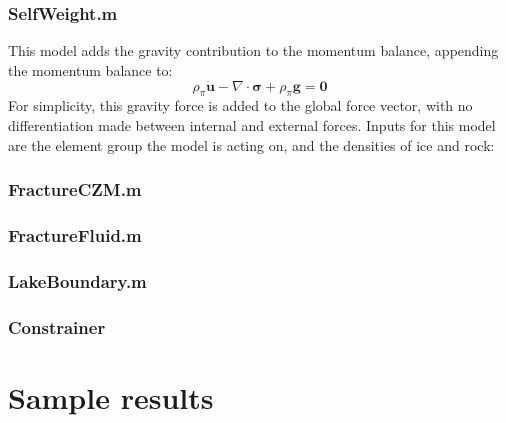 \documentclass[3p]{elsarticle} %
\begin{document}
\subsubsection{SelfWeight.m}
This model adds the gravity contribution to the momentum balance, appending the momentum balance to:
\begin{equation}
	\rho_\pi \ddot{\mathbf{u}} - \nabla \cdot \mathbf{\sigma} + \rho_\pi \mathbf{g}= \mathbf{0}
\end{equation}
For simplicity, this gravity force is added to the global force vector, with no differentiation made between internal and external forces. Inputs for this model are the element group the model is acting on, and the densities of ice and rock:


\subsubsection{FractureCZM.m}



\subsubsection{FractureFluid.m}




\subsubsection{LakeBoundary.m}




\subsubsection{Constrainer}



\section{Sample results}



\end{document}
